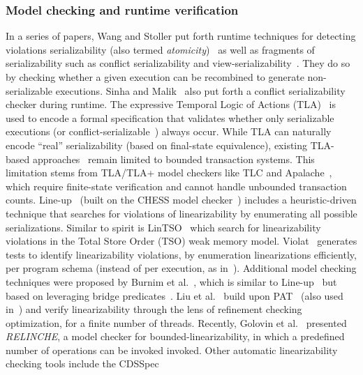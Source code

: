 \subsubsection{Model checking and runtime verification}

In a series of papers, Wang and Stoller put forth runtime techniques for 
detecting violations serializability (also termed 
\textit{atomicity})~\cite{WaSt06a} as well as fragments of serializability such 
as conflict serializability and view-serializability~\cite{WaSt06b}. They do so 
by  checking whether a given execution can be recombined to generate 
non-serializable executions.
%
Sinha and Malik~\cite{SiMa10} also put forth a conflict serializability checker 
during runtime.
%
The expressive Temporal Logic of Actions (TLA)~\cite{La94} is used to encode a 
formal specification that validates whether only serializable executions (or 
conflict-serializable~\cite{CoOlPnTuZu07}) always occur. 
While TLA can naturally encode ``real'' serializability (based on final-state 
equivalence), existing TLA-based approaches~\cite{SoVaVi20, Ho24} remain 
limited to bounded transaction systems. This limitation stems from TLA/TLA+ 
model checkers like TLC and Apalache~\cite{YuMaLa99, KoKuTr19}, which require 
finite-state verification and cannot handle unbounded transaction counts.
%
Line-up~\cite{BuDeMuTa10} (built on the CHESS model 
checker~\cite{MuQaBaBaNaNe08}) includes a heuristic-driven technique that 
searches for violations of linearizability by enumerating all possible 
serializations. Similar to spirit is LinTSO~\cite{BuGoMuYa12} which search for 
linearizability violations in the Total Store
Order (TSO) weak memory model.
%
Violat~\cite{EmEn19} generates tests to identify linearizability violations, by 
enumeration linearizations efficiently, per program schema (instead of per 
execution, as in~\cite{BuDeMuTa10}).
%
Additional model checking techniques were proposed by Burnim et 
al.~\cite{BuNeSe11}, which is similar to  Line-up~\cite{BuDeMuTa10} but based 
on leveraging bridge predicates~\cite{BuSe09}. 
Liu et al.~\cite{LiChLiSuZhDo12} build upon PAT~\cite{SuLuDoPa09} (also used 
in~\cite{LiChLiSu09,Zh11}) and verify linearizability through the lens of 
refinement checking optimization, for a finite number of threads.
%
%
Recently, Golovin et al.~\cite{GoKoVa25} presented \textit{RELINCHE}, a model 
checker for bounded-linearizability, in which a predefined number of operations 
can be invoked invoked.
%
Other automatic linearizability checking tools include the CDSSpec 

